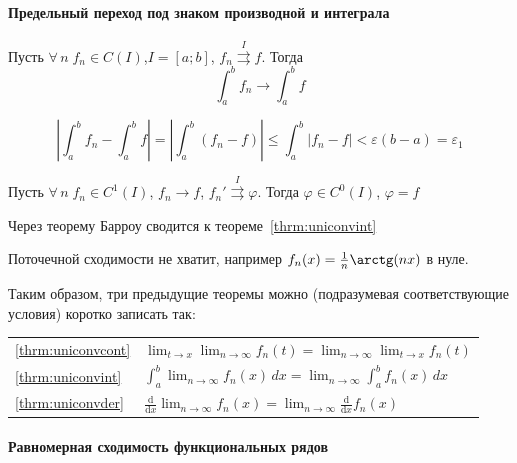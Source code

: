 \documentclass[12pt]{../../notes}
\begin{document}
\paragraph{Предельный переход под знаком производной и интеграла}
\begin{thrm}\label{thrm:uniconvint}
  Пусть $\forall\, n \; f_n \in C(I)$,$I=[a;b]$, $f_n \overset{I}{\rightrightarrows} f$. 
  Тогда
  \[
    \int_{a}^{b} f_n \to \int_{a}^{b} f
  \]
\end{thrm}
\begin{ittproof}
 \[
   \left| \int_a^b f_n - \int_a^b f \right| = \left| \int_a^b (f_n - f) \right| \leqslant 
  \int_a^b |f_n - f| < \varepsilon (b - a) = \varepsilon_1
 \]
\end{ittproof}


\begin{thrm}\label{thrm:uniconvder}
  Пусть $\forall\, n \; f_n \in C^1(I)$, $f_n \rightarrow f$, $f_n' \overset{I}{\rightrightarrows} \varphi $.
  Тогда $\varphi \in C^0(I)$, $\varphi = f$
\end{thrm}
\begin{ittproof}
  Через теорему Барроу сводится к теореме~\ref{thrm:uniconvint}
\end{ittproof}

\begin{rem*}
  Поточечной сходимости не хватит, например $f_n(x) = \frac{1}{n} \arctg(nx)$ в нуле.
\end{rem*}

Таким образом, три предыдущие теоремы можно (подразумевая соответствующие условия) коротко записать так:
\begin{table}[h!]
  \begin{tabular}{ll}
    \ref{thrm:uniconvcont} 
    & $\displaystyle \lim_{t\to x} \lim_{n\to \infty} f_n(t) = \lim_{n\to \infty} \lim_{t\to x} f_n(t) $ \\
    \ref{thrm:uniconvint} 
    & $\displaystyle \int_a^b \lim_{n\to \infty} f_n(x) \, dx = \lim_{n\to \infty} \int_a^b f_n(x) \, dx$ \\
    \ref{thrm:uniconvder} 
    & $\displaystyle \frac{\mathrm{d}}{\mathrm{d}x} \lim_{n\to \infty} f_n(x) 
    = \lim_{n\to \infty} \frac{\mathrm{d}}{\mathrm{d}x} f_n(x) $
  \end{tabular}
\end{table}

\paragraph{Равномерная сходимость функциональных рядов}
\end{document}
